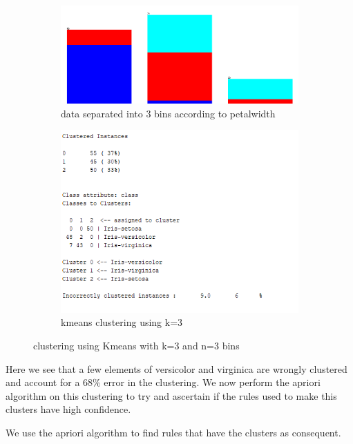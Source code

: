\documentclass[letterpaper,12pt]{article}
\begin{document}
\begin{figure}[H]
\begin{subfigure}{.5\textwidth}
  \centering
  \includegraphics[width=.8\linewidth]{3bins_petalwidth}  
  \caption{data separated into 3 bins according to petalwidth}
  \label{fig:sub-first_1}
\end{subfigure}
\begin{subfigure}{.5\textwidth}
  \centering
  \includegraphics[width=.8\linewidth]{3bins_3cl_output}  
  \caption{kmeans clustering using k=3}
  \label{fig:sub-second_1}
\end{subfigure}
\caption{clustering using Kmeans with k=3 and n=3 bins}
\label{fig:fig_1}
\end{figure}

Here we see that a few elements of versicolor and virginica are wrongly clustered and account for a 68\% error in the clustering. We now perform the apriori algorithm on this clustering to try and ascertain if the rules used to make this clusters have high confidence.

We use the apriori algorithm to find rules that have the clusters as consequent.
\end{document}
